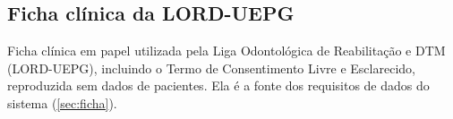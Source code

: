 \documentclass[
12pt,				%
openright,			%
oneside,			%
a4paper,			%
chapter=TITLE,		%
section=TITLE,		%
english,			%
french,				%
spanish,			%
brazil				%
]{abntex2-uepg}
\begin{document}
	\tableofcontents*
	\cleardoublepage
	\textual
	
	
	
	
	
	
	\postextual
	\setlength\afterchapskip{18pt}
	
	

%
%


\begin{apendicesenv}

	\renewcommand{\thetable}{\Alph{chapter}.\arabic{table}}
	\renewcommand{\thefigure}{\Alph{chapter}.\arabic{figure}}
	\renewcommand{\thequadro}{\Alph{chapter}.\arabic{quadro}}

	

\end{apendicesenv}


\begin{anexosenv}

	\chapter{Ficha clínica da LORD-UEPG}
	\label{anexo:ficha}
	Ficha clínica em papel utilizada pela Liga Odontológica de Reabilitação e DTM (LORD-UEPG), incluindo o Termo de Consentimento Livre e Esclarecido, reproduzida sem dados de pacientes. Ela é a fonte dos requisitos de dados do sistema (\autoref{sec:ficha}).

	

\end{anexosenv}

\printindex
\end{document}
